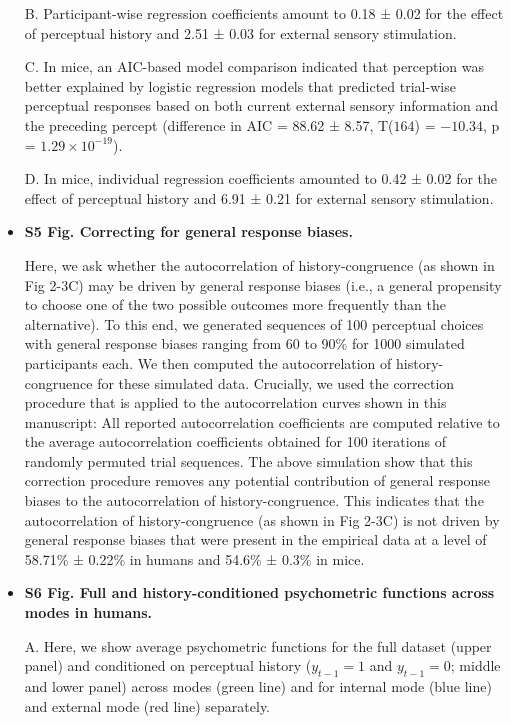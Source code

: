 \documentclass[
]{article}
\begin{document}
\begin{itemize}
B. Participant-wise regression coefficients amount to 0.18 ± 0.02 for
the effect of perceptual history and 2.51 ± 0.03 for external sensory
stimulation.

C. In mice, an AIC-based model comparison indicated that perception was
better explained by logistic regression models that predicted trial-wise
perceptual responses based on both current external sensory information
and the preceding percept (difference in AIC = 88.62 ± 8.57, T(\(164\))
= \(-10.34\), p = \(\ensuremath{1.29\times 10^{-19}}\)).

D. In mice, individual regression coefficients amounted to 0.42 ± 0.02
for the effect of perceptual history and 6.91 ± 0.21 for external
sensory stimulation.

\item \textbf{S5 Fig. Correcting for general response biases.}

Here, we ask whether the autocorrelation of history-congruence (as shown
in Fig 2-3C) may be driven by general response biases (i.e., a
general propensity to choose one of the two possible outcomes more
frequently than the alternative). To this end, we generated sequences of
100 perceptual choices with general response biases ranging from 60 to
90\% for 1000 simulated participants each. We then computed the
autocorrelation of history-congruence for these simulated data.
Crucially, we used the correction procedure that is applied to the
autocorrelation curves shown in this manuscript: All reported
autocorrelation coefficients are computed relative to the average
autocorrelation coefficients obtained for 100 iterations of randomly
permuted trial sequences. The above simulation show that this correction
procedure removes any potential contribution of general response biases
to the autocorrelation of history-congruence. This indicates that the
autocorrelation of history-congruence (as shown in Fig 2-3C) is not
driven by general response biases that were present in the empirical
data at a level of 58.71\% ± 0.22\% in humans and 54.6\% ± 0.3\% in
mice.

\item \textbf{S6 Fig. Full and history-conditioned psychometric functions across modes in humans.}

A. Here, we show average psychometric functions for the full dataset
(upper panel) and conditioned on perceptual history (\(y_{t-1} = 1\) and
\(y_{t-1} = 0\); middle and lower panel) across modes (green line) and
for internal mode (blue line) and external mode (red line) separately.


\end{itemize}
\end{document}
